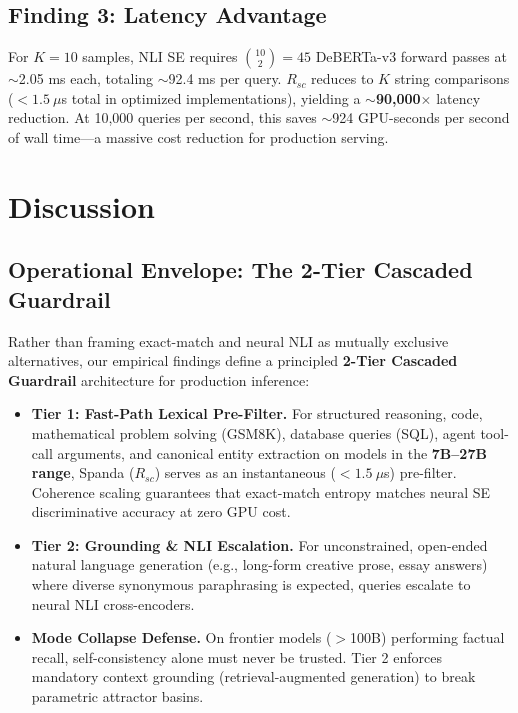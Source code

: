 \documentclass[11pt]{article}
\begin{document}
\subsection{Finding 3: Latency Advantage}

For $K=10$ samples, NLI SE requires $\binom{10}{2} = 45$ DeBERTa-v3 forward passes at $\sim$2.05 ms each, totaling $\sim$92.4 ms per query. $R_{sc}$ reduces to $K$ string comparisons ($< 1.5\ \mu$s total in optimized implementations), yielding a $\sim$\textbf{90,000$\times$} latency reduction. At 10,000 queries per second, this saves $\sim$924 GPU-seconds per second of wall time---a massive cost reduction for production serving.

\section{Discussion}

\subsection{Operational Envelope: The 2-Tier Cascaded Guardrail}

Rather than framing exact-match and neural NLI as mutually exclusive alternatives, our empirical findings define a principled \textbf{2-Tier Cascaded Guardrail} architecture for production inference:

\begin{itemize}
    \item \textbf{Tier 1: Fast-Path Lexical Pre-Filter.} For structured reasoning, code, mathematical problem solving (GSM8K), database queries (SQL), agent tool-call arguments, and canonical entity extraction on models in the \textbf{7B--27B range}, Spanda ($R_{sc}$) serves as an instantaneous ($< 1.5\ \mu$s) pre-filter. Coherence scaling guarantees that exact-match entropy matches neural SE discriminative accuracy at zero GPU cost.
    \item \textbf{Tier 2: Grounding \& NLI Escalation.} For unconstrained, open-ended natural language generation (e.g., long-form creative prose, essay answers) where diverse synonymous paraphrasing is expected, queries escalate to neural NLI cross-encoders.
    \item \textbf{Mode Collapse Defense.} On frontier models ($>$100B) performing factual recall, self-consistency alone must never be trusted. Tier 2 enforces mandatory context grounding (retrieval-augmented generation) to break parametric attractor basins.
\end{itemize}
\end{document}
